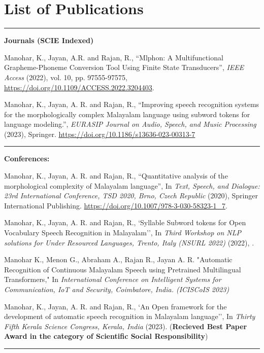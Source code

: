 \chapter*{List of Publications} \label{publications}
\noindent\rule{\linewidth}{2pt}
\textbf{{\large Journals (SCIE Indexed)}}
\begin{enumerate}[label=\textbf{[\arabic*]}]

\item Manohar, K., Jayan, A.R. and Rajan, R., ``Mlphon: A Multifunctional Grapheme-Phoneme Conversion Tool Using Finite State Transducers'',
\emph{IEEE Access} (2022), vol. 10, pp. 97555-97575, 
\url{https://doi.org/10.1109/ACCESS.2022.3204403}.


\item Manohar, K., Jayan, A. R. and Rajan, R., ``Improving speech recognition systems for the morphologically complex Malayalam language using subword tokens for language modeling.'',
\emph{EURASIP Journal on Audio, Speech, and Music Processing} (2023), Springer. \url{https://doi.org/10.1186/s13636-023-00313-7}

\end{enumerate}

\noindent\rule{\linewidth}{0.2pt}
\textbf{{\large Conferences:}}
\begin{enumerate}[label=\textbf{[\arabic*]}]

\item Manohar, K., Jayan, A. R. and Rajan, R., ``Quantitative analysis of the morphological complexity of Malayalam language'',
In \emph{ Text, Speech, and Dialogue: 23rd International Conference, TSD 2020, Brno, Czech Republic} (2020), Springer International Publishing.
\url{https://doi.org/10.1007/978-3-030-58323-1_7}.

\item Manohar, K., Jayan, A. R. and Rajan, R., `Syllable Subword tokens for Open Vocabulary Speech Recognition in Malayalam'',
In \emph{Third Workshop on NLP solutions for Under Resourced Languages, Trento, Italy (NSURL 2022)} (2022), \url{}.

\item Manohar K., Menon G., Abraham A., Rajan R., Jayan A. R.  "Automatic Recognition of Continuous Malayalam Speech using Pretrained Multilingual Transformers," In \emph{  International Conference on Intelligent Systems for Communication, IoT and Security, Coimbatore, India. (ICISCoIS 2023)}

\item Manohar, K., Jayan, A. R. and Rajan, R., `An Open framework for the development of automatic speech recognition in Malayalam language'',
In \emph{Thirty Fifth Kerala Science Congress, Kerala, India} (2023). (\textbf{Recieved Best Paper Award in the category of Scientific Social Responsibility})


\end{enumerate}
\noindent\rule{\linewidth}{0.2pt}

